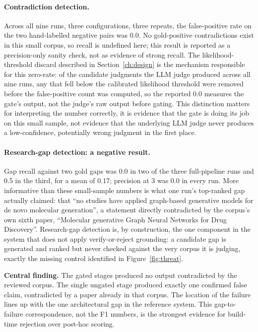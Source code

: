 \documentclass[12pt,a4paper]{report}
\begin{document}
\paragraph{Contradiction detection.}
Across all nine runs, three configurations, three repeats, the
false-positive rate on the two hand-labelled negative pairs was 0.0. No
gold-positive contradictions exist in this small corpus, so recall is
undefined here; this result is reported as a precision-only sanity check,
not as evidence of strong recall. The likelihood-threshold discard described
in Section~\ref{ch:design} is the mechanism responsible for this zero-rate:
of the candidate judgments the LLM judge produced across all nine runs, any
that fell below the calibrated likelihood threshold were removed before the
false-positive count was computed, so the reported 0.0 measures the gate's
output, not the judge's raw output before gating. This distinction matters for
interpreting the number correctly, it is evidence that the gate is doing its
job on this small sample, not evidence that the underlying LLM judge never
produces a low-confidence, potentially wrong judgment in the first place.

\paragraph{Research-gap detection: a negative result.}
\label{sec:gap-negative}
Gap recall against two gold gaps was 0.0 in two of the three full-pipeline
runs and 0.5 in the third, for a mean of 0.17; precision at 3 was 0.0 in every
run. More informative than these small-sample numbers is what one run's
top-ranked gap actually claimed: that ``no studies have applied graph-based
generative models for de novo molecular generation'', a statement directly
contradicted by the corpus's own sixth paper, ``Molecular generative Graph
Neural Networks for Drug Discovery''. Research-gap detection is, by
construction, the one component in the system that does not apply
verify-or-reject grounding: a candidate gap is generated and ranked but never
checked against the very corpus it is judging, exactly the missing control
identified in Figure~\ref{fig:threat}.

\begin{keybox}
\textbf{Central finding.} The gated stages produced no output contradicted by
the reviewed corpus. The single ungated stage produced exactly one confirmed
false claim, contradicted by a paper already in that corpus. The location of
the failure lines up with the one architectural gap in the reference system.
This gap-to-failure correspondence, not the F1 numbers, is the strongest
evidence for build-time rejection over post-hoc scoring.
\end{keybox}
\end{document}
